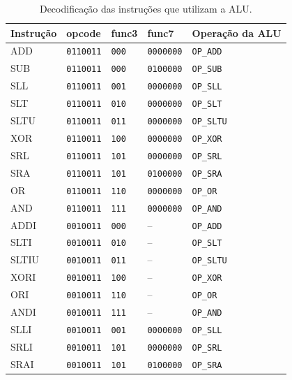 \begin{table}[!htb]
\centering
\caption{Decodificação das instruções que utilizam a ALU.}
\label{tab:control-unit-alu-decode}
\begin{tabular}{lllll}
\toprule
\textbf{Instrução} & \textbf{opcode} & \textbf{func3} & \textbf{func7} & \textbf{Operação da ALU} \\
\midrule
ADD   & \texttt{0110011} & \texttt{000} & \texttt{0000000} & \texttt{OP\_ADD} \\
SUB   & \texttt{0110011} & \texttt{000} & \texttt{0100000} & \texttt{OP\_SUB} \\
SLL   & \texttt{0110011} & \texttt{001} & \texttt{0000000} & \texttt{OP\_SLL} \\
SLT   & \texttt{0110011} & \texttt{010} & \texttt{0000000} & \texttt{OP\_SLT} \\
SLTU  & \texttt{0110011} & \texttt{011} & \texttt{0000000} & \texttt{OP\_SLTU} \\
XOR   & \texttt{0110011} & \texttt{100} & \texttt{0000000} & \texttt{OP\_XOR} \\
SRL   & \texttt{0110011} & \texttt{101} & \texttt{0000000} & \texttt{OP\_SRL} \\
SRA   & \texttt{0110011} & \texttt{101} & \texttt{0100000} & \texttt{OP\_SRA} \\
OR    & \texttt{0110011} & \texttt{110} & \texttt{0000000} & \texttt{OP\_OR} \\
AND   & \texttt{0110011} & \texttt{111} & \texttt{0000000} & \texttt{OP\_AND} \\
\addlinespace
ADDI  & \texttt{0010011} & \texttt{000} & -- & \texttt{OP\_ADD} \\
SLTI  & \texttt{0010011} & \texttt{010} & -- & \texttt{OP\_SLT} \\
SLTIU & \texttt{0010011} & \texttt{011} & -- & \texttt{OP\_SLTU} \\
XORI  & \texttt{0010011} & \texttt{100} & -- & \texttt{OP\_XOR} \\
ORI   & \texttt{0010011} & \texttt{110} & -- & \texttt{OP\_OR} \\
ANDI  & \texttt{0010011} & \texttt{111} & -- & \texttt{OP\_AND} \\
SLLI  & \texttt{0010011} & \texttt{001} & \texttt{0000000} & \texttt{OP\_SLL} \\
SRLI  & \texttt{0010011} & \texttt{101} & \texttt{0000000} & \texttt{OP\_SRL} \\
SRAI  & \texttt{0010011} & \texttt{101} & \texttt{0100000} & \texttt{OP\_SRA} \\
\bottomrule
\end{tabular}
\end{table}

